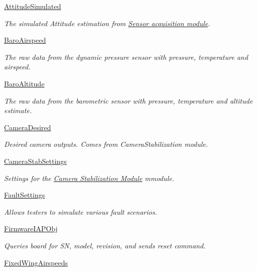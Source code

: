 \begin{DoxyCompactItemize}
\hyperlink{group___attitude_simulated}{\-Attitude\-Simulated}
\begin{DoxyCompactList}\small\item\em \-The simulated \-Attitude estimation from \hyperlink{group___sensors}{\-Sensor acquisition module}. \end{DoxyCompactList}\item 
\hyperlink{group___baro_airspeed}{\-Baro\-Airspeed}
\begin{DoxyCompactList}\small\item\em \-The raw data from the dynamic pressure sensor with pressure, temperature and airspeed. \end{DoxyCompactList}\item 
\hyperlink{group___baro_altitude}{\-Baro\-Altitude}
\begin{DoxyCompactList}\small\item\em \-The raw data from the barometric sensor with pressure, temperature and altitude estimate. \end{DoxyCompactList}\item 
\hyperlink{group___camera_desired}{\-Camera\-Desired}
\begin{DoxyCompactList}\small\item\em \-Desired camera outputs. \-Comes from \-Camera\-Stabilization module. \end{DoxyCompactList}\item 
\hyperlink{group___camera_stab_settings}{\-Camera\-Stab\-Settings}
\begin{DoxyCompactList}\small\item\em \-Settings for the \hyperlink{group___camera_stab}{\-Camera \-Stabilization \-Module} mmodule. \end{DoxyCompactList}\item 
\hyperlink{group___fault_settings}{\-Fault\-Settings}
\begin{DoxyCompactList}\small\item\em \-Allows testers to simulate various fault scenarios. \end{DoxyCompactList}\item 
\hyperlink{group___firmware_i_a_p_obj}{\-Firmware\-I\-A\-P\-Obj}
\begin{DoxyCompactList}\small\item\em \-Queries board for \-S\-N, model, revision, and sends reset command. \end{DoxyCompactList}\item 
\hyperlink{group___fixed_wing_airspeeds}{\-Fixed\-Wing\-Airspeeds}

\end{DoxyCompactItemize}
